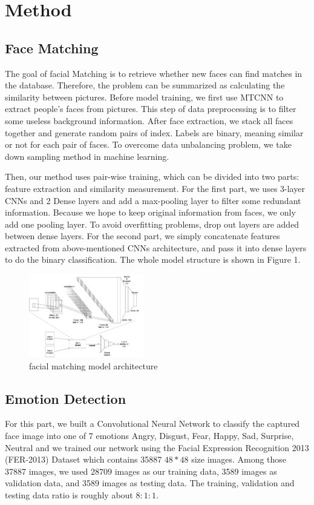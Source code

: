 \documentclass[10pt,twocolumn,letterpaper]{article}
\begin{document}
\section{Method}
\subsection{Face Matching}
\label{sec:faceMatching}
The goal of facial Matching is to retrieve whether new faces can find matches in the database. Therefore, the problem can be summarized as calculating the similarity between pictures. 
Before model training, we first use MTCNN\cite{MTCNN} to extract people's faces from pictures. This step of data preprocessing is to filter some useless background information. After face extraction, we stack all faces together and generate random pairs of index. Labels are binary, meaning similar or not for each pair of faces. To overcome data unbalancing problem, we take down sampling method in machine learning. 

Then, our method uses pair-wise training, which can be divided into two parts: feature extraction and similarity measurement. For the first part, we uses 3-layer CNNs and 2 Dense layers and add a max-pooling layer to filter some redundant information. Because we hope to keep original information from faces, we only add one pooling layer. To avoid overfitting problems, drop out layers are added between dense layers. For the second part, we simply concatenate features extracted from above-mentioned CNNs architecture, and pass it into dense layers to do the binary classification. The whole model structure is shown in Figure 1\label{fig:result1}. 
\begin{figure}[h]
    \centering
    \includegraphics[width=5cm]{face recognition.png}
    \caption{facial matching model architecture}
    \label{fig:result1}
\end{figure}
\subsection{Emotion Detection}
\label{sec:emotion}
For this part, we built a Convolutional Neural Network to classify the captured face image into one of 7 emotions {Angry, Disgust, Fear, Happy, Sad, Surprise, Neutral} and we trained our network using the Facial Expression Recognition 2013 (FER-2013) Dataset \cite{Goodfeli-et-al-2013} which contains 35887 $48 * 48$ size images. Among those 37887 images, we used $28709$ images as our training data, 3589 images as validation data, and 3589 images as testing data.  The training, validation and testing data ratio is roughly about $8:1:1$. 
\end{document}
